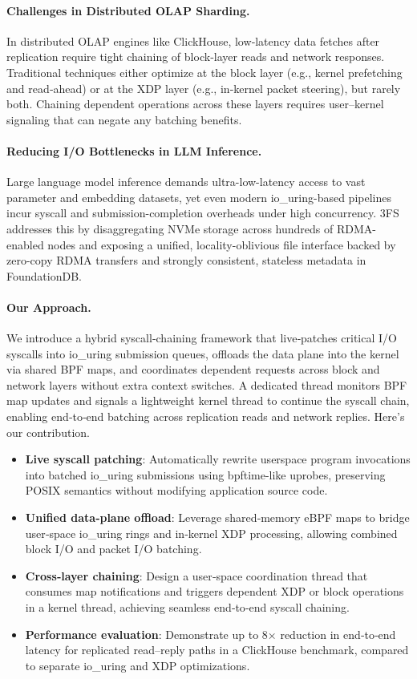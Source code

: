 \documentclass[sigconf,10pt]{acmart}
\begin{document}
\paragraph{Challenges in Distributed OLAP Sharding.}
In distributed OLAP engines like ClickHouse, low‐latency data fetches after replication require tight chaining of block‐layer reads and network responses.  Traditional techniques either optimize at the block layer (e.g., kernel prefetching and read‐ahead) or at the XDP layer (e.g., in‐kernel packet steering), but rarely both.  Chaining dependent operations across these layers requires user–kernel signaling that can negate any batching benefits.  

\paragraph{Reducing I/O Bottlenecks in LLM Inference.}  
Large language model inference demands ultra-low-latency access to vast parameter and embedding datasets, yet even modern io\_uring-based pipelines incur syscall and submission-completion overheads under high concurrency. 3FS\cite{3fs,zhao2025insightsdeepseekv3scalingchallenges} addresses this by disaggregating NVMe storage across hundreds of RDMA-enabled nodes and exposing a unified, locality-oblivious file interface backed by zero-copy RDMA transfers and strongly consistent, stateless metadata in FoundationDB.

\paragraph{Our Approach.}
We introduce a hybrid syscall‐chaining framework that live‐patches critical I/O syscalls into io\_uring submission queues, offloads the data plane into the kernel via shared BPF maps, and coordinates dependent requests across block and network layers without extra context switches.  A dedicated thread monitors BPF map updates and signals a lightweight kernel thread to continue the syscall chain, enabling end‐to‐end batching across replication reads and network replies. Here's our contribution.

\begin{itemize}[leftmargin=*,itemsep=0pt]
  \item \textbf{Live syscall patching}: Automatically rewrite userspace program invocations into batched io\_uring submissions using bpftime-like uprobes, preserving POSIX semantics without modifying application source code.
  \item \textbf{Unified data‐plane offload}: Leverage shared‐memory eBPF maps to bridge user‐space io\_uring rings and in‐kernel XDP processing, allowing combined block I/O and packet I/O batching.
  \item \textbf{Cross‐layer chaining}: Design a user‐space coordination thread that consumes map notifications and triggers dependent XDP or block operations in a kernel thread, achieving seamless end‐to‐end syscall chaining.
  \item \textbf{Performance evaluation}: Demonstrate up to 8× reduction in end‐to‐end latency for replicated read–reply paths in a ClickHouse benchmark, compared to separate io\_uring and XDP optimizations.
\end{itemize}
\end{document}
